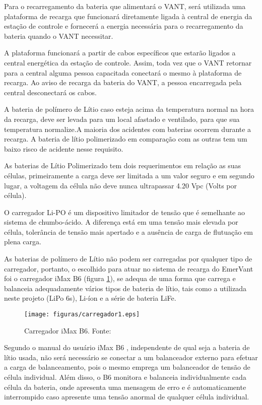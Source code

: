 Para o recarregamento da bateria que alimentará o VANT, será utilizada uma plataforma de recarga que funcionará diretamente ligada à  central de energia da estação de controle e fornecerá a energia necessária para o recarregamento da bateria quando o VANT necessitar.

A plataforma funcionará a partir de cabos específicos que estarão ligados a central energética da estação de controle. Assim, toda vez que o VANT retornar para a central alguma pessoa capacitada conectará o mesmo à plataforma de recarga. Ao aviso de recarga da bateria do VANT, a pessoa encarregada pela central desconectará os cabos.

A bateria de polímero de Lítio caso esteja acima da temperatura normal na hora da recarga, deve ser levada para um local afastado e ventilado, para que sua temperatura normalize.A maioria dos acidentes com baterias ocorrem durante a recarga. A bateria de lítio polimerizado em comparação com as outras tem um baixo risco de acidente nesse requisito. \cite{gibbs}

As baterias de Lítio Polimerizado tem dois requerimentos em relação as suas células, primeiramente a carga deve ser limitada a um valor seguro e em segundo lugar, a voltagem da célula não deve nunca ultrapassar 4.20 Vpc (Volts por célula). \cite{gibbs}

O carregador Li-PO é um dispositivo limitador de tensão que é semelhante ao sistema de chumbo-ácido. A diferença está em uma tensão mais elevada por célula, tolerância de tensão mais apertado e a ausência de carga de flutuação em plena carga.

As baterias de polímero de Lítio não podem ser carregadas por qualquer tipo de carregador, portanto, o escolhido para atuar no sistema de recarga do EmerVant foi o carregador iMax B6 (figura \ref{fig:carregador1}), se adequa de uma forma que carrega e balanceia adequadamente vários tipos de bateria de lítio, tais como a utilizada neste projeto (LiPo 6s), Li-íon e a série de bateria LiFe.


 \begin{figure}[h!]
    \centering
	\texttt{[image: figuras/carregador1.eps]}
    \caption{Carregador iMax B6. Fonte: \cite{carregador1}}
    \label{fig:carregador1}
\end{figure}


Segundo o manual do usuário iMax B6 \cite{ibmax}, independente de qual seja a bateria de lítio usada, não será necessário se conectar a um balanceador externo para efetuar a carga de balanceamento, pois o mesmo emprega um balanceador de tensão de célula individual. Além disso, o B6 monitora e balanceia individualmente cada célula da bateria, onde apresenta uma mensagem de erro e é automaticamente interrompido caso apresente uma tensão anormal de qualquer célula individual. 

